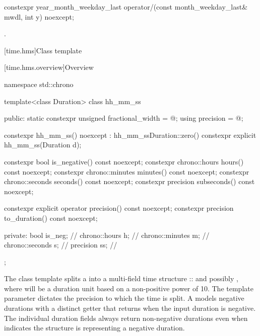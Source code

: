 \begin{itemdecl}
constexpr year_month_weekday_last
  operator/(const month_weekday_last& mwdl, int y) noexcept;
\end{itemdecl}

\begin{itemdescr}
\pnum
\returns
{}.
\end{itemdescr}


[time.hms]{Class template }

[time.hms.overview]{Overview}

\begin{codeblock}
namespace std::chrono {
  template<class Duration> class hh_mm_ss {
  public:
    static constexpr unsigned fractional_width = @\seebelow@;
    using precision                            = @\seebelow@;

    constexpr hh_mm_ss() noexcept : hh_mm_ss{Duration::zero()} {}
    constexpr explicit hh_mm_ss(Duration d);

    constexpr bool is_negative() const noexcept;
    constexpr chrono::hours hours() const noexcept;
    constexpr chrono::minutes minutes() const noexcept;
    constexpr chrono::seconds seconds() const noexcept;
    constexpr precision subseconds() const noexcept;

    constexpr explicit operator precision() const noexcept;
    constexpr precision to_duration() const noexcept;

  private:
    bool            is_neg;     // \expos
    chrono::hours   h;          // \expos
    chrono::minutes m;          // \expos
    chrono::seconds s;          // \expos
    precision       ss;         // \expos
  };
}
\end{codeblock}

\pnum
The  class template
splits a 
into a multi-field time structure
:: and
possibly ,
where  will be a duration unit
based on a non-positive power of 10.
The  template parameter dictates the precision
to which the time is split.
A  models negative durations
with a distinct  getter
that returns  when the input duration is negative.
The individual duration fields always return non-negative durations
even when  indicates
the structure is representing a negative duration.

